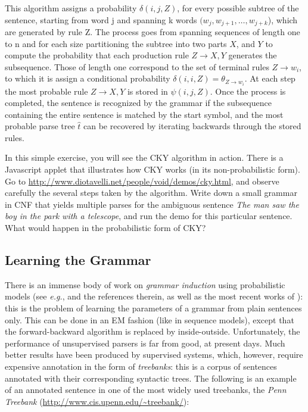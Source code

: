 This algorithm assigns a probability $\delta(i,j,Z)$, for every possible subtree of the sentence, starting from word j and spanning k words $(w_j,w_{j+1},\dots,w_{j+k}$), which are generated by rule Z. The process goes from spanning sequences of length one to n and for each size partitioning the subtree into two parts $X$, and $Y$ to compute the probability that each production rule $Z\rightarrow X,Y$ generates the subsequence. Those of length one correspond to the set of terminal rules ${Z\rightarrow w_i}$, to which it is assign a conditional probability $\delta(i,i,Z)=\theta_{Z\rightarrow w_i}$. At each step the most probable rule $Z\rightarrow X,Y$ is stored in $\psi(i,j,Z)$.
Once the process is completed, the sentence is recognized by the grammar if the subsequence containing the entire sentence is matched by the start symbol, and the most probable parse tree $\hat{t}$ can be recovered by iterating backwards through the stored rules.

\begin{exercise}\label{exer:cky}
In this simple exercise, you will see the CKY algorithm in action. There is a Javascript applet that 
illustrates how CKY works (in its non-probabilistic form). 
Go to \url{http://www.diotavelli.net/people/void/demos/cky.html}, and 
observe carefully the several steps taken by the algorithm. 
Write down a small grammar in CNF that yields multiple parses for 
the ambiguous sentence \emph{The man saw the boy in the park with a telescope}, 
and run the demo for this particular sentence. What would happen in the probabilistic form of CKY? 
\end{exercise}

\subsection{Learning the Grammar}

There is an immense body of work on \emph{grammar induction} using probabilistic models (see \emph{e.g.}, \citet{Manning1999} 
and the references therein, as well as the most recent works of \citet{Klein2002,Smith2005,Cohen2008}): this is the problem of 
learning the parameters of a grammar from plain sentences only. This can be done in an EM fashion (like in sequence models), 
except that the forward-backward algorithm is replaced by inside-outside. 
Unfortunately, the performance of unsupervised parsers is far from good, at present days. 
Much better results have been produced by supervised systems, which, however, require expensive annotation in the form of 
\emph{treebanks}: this is a corpus of sentences annotated with their corresponding syntactic trees. 
The following is an example of an annotated sentence in one of the most widely used treebanks, the \emph{Penn Treebank} 
(\url{http://www.cis.upenn.edu/~treebank/}): 

